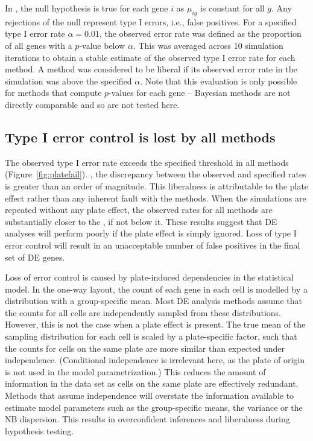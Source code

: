 \documentclass[oupdraft]{bio}
\begin{document}
In , the null hypothesis is true for each gene $i$ as $\mu_{ig}$ is constant for all $g$.
Any rejections of the null represent type I errors, i.e., false positives.
For a specified type I error rate $\alpha = 0.01$, the observed error rate was defined as the proportion of all genes with a $p$-value below $\alpha$.
This was averaged across 10 simulation iterations to obtain a stable estimate of the observed type I error rate for each method. 
A method was considered to be liberal if its observed error rate in the simulation was above the specified $\alpha$.
Note that this evaluation is only possible for methods that compute $p$-values for each gene -- 
    Bayesian methods \citep{vallejos2016beyond,kharchenko2014bayesian} are not directly comparable and so are not tested here.


\subsection{Type I error control is lost by all methods}
The observed type I error rate exceeds the specified threshold in all methods (Figure~\ref{fig:platefail}).
, the discrepancy between the observed and specified rates is greater than an order of magnitude.
This liberalness is attributable to the plate effect rather than any inherent fault with the methods.
When the simulations are repeated without any plate effect, the observed rates for all methods are substantially closer to the , if not below it.
These results suggest that DE analyses will perform poorly if the plate effect is simply ignored.
Loss of type I error control will result in an unacceptable number of false positives in the final set of DE genes.

Loss of error control is caused by plate-induced dependencies in the statistical model.
In the one-way layout, the count of each gene in each cell is modelled by a distribution with a group-specific mean.
Most DE analysis methods assume that the counts for all cells are independently sampled from these distributions.
However, this is not the case when a plate effect is present.
The true mean of the sampling distribution for each cell is scaled by a plate-specific factor, 
    such that the counts for cells on the same plate are more similar than expected under independence.
(Conditional independence is irrelevant here, as the plate of origin is not used in the model parametrization.)
This reduces the amount of information in the data set as cells on the same plate are effectively redundant.
Methods that assume independence will overstate the information available to estimate model parameters such as the group-specific means, the variance or the NB dispersion.
This results in overconfident inferences and liberalness during hypothesis testing.
\end{document}
